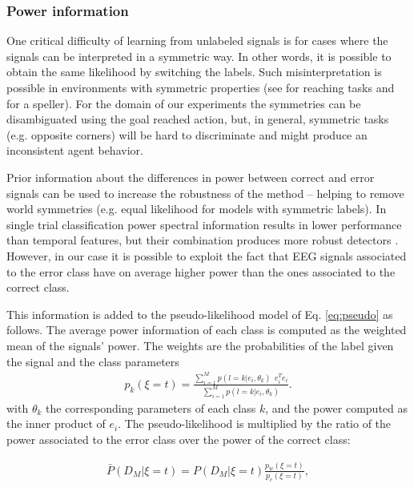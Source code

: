 \documentclass[10pt,letterpaper]{article}
\begin{document}
\subsubsection{Power information}
One  critical difficulty of learning from unlabeled signals is for cases where the signals can be interpreted in a symmetric way. In other words, it is possible to obtain the same likelihood by switching the labels. Such misinterpretation is possible in environments with symmetric properties (see \cite{grizou2014interactive} for reaching tasks and \cite{Kindermans2012a,kindermans2014true} for a speller). For the domain of our experiments the symmetries can be disambiguated using the goal reached action, but, in general, symmetric tasks (e.g. opposite corners) will be hard to discriminate and might produce an inconsistent agent behavior.

Prior information about the differences in power between correct and error signals can be used to increase the robustness of the method -- helping to remove world symmetries (e.g. equal likelihood for models with symmetric labels). 
In single trial classification power spectral information results in lower performance than temporal features, but their combination produces more robust detectors \cite{Omedes13ErrPFreq}.
%
However, in our case it is possible to exploit the fact that EEG signals associated to the error class have on average higher power than the ones associated to the correct class.

This information is added to the pseudo-likelihood model of Eq. \ref{eq:pseudo} as follows. The average power information of each class is computed as  the weighted mean of the signals' power. The weights are the probabilities of the label given the signal and the class parameters 
%
\begin{eqnarray}
	p_k(\xi=t) = \frac{\sum_{i = 1}^{M} p(l = k | e_i , \theta_k) ~~ e_i^T e_i}{\sum_{i = 1}^{M} p(l = k | e_i , \theta_k)}.
	\label{eq:powerCorrect}
\end{eqnarray}
%
with $\theta_k$ the corresponding parameters of each class $k$, and the power computed as the inner product of $e_i$.
%
The pseudo-likelihood is multiplied by the ratio of the power associated to the error class over the power of the correct class:

\begin{eqnarray}
	\bar{P}(D_M | \xi=t) = P(D_M | \xi=t) \frac{p_w(\xi=t)}{p_c(\xi=t)},
	\label{eq:power}
\end{eqnarray}
\end{document}
